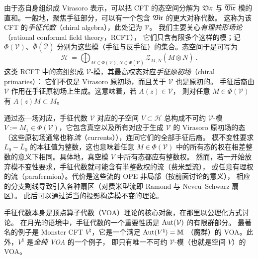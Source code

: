 由于态自身组织成 Virasoro 表示，可以把 CFT 的态空间分解为 $\mathfrak{Vir}$ 与 $\overline{\mathfrak{Vir}}$
模的直和。一般地，聚焦手征部分，可以有一个包含 $\mathfrak{Vir}$ 的更大对称代数。
这称为该 CFT 的\emph{手征代数}（chiral algebra），此处记为 $\mathcal{V}$。
我们主要关心\emph{有理共形场论}（rational conformal field theory，RCFT），
它们只含有限多个这样的模；记 $\Phi(\mathcal{V})$、$\overline{\Phi}(\overline{\mathcal{V}})$
分别为这些模（手征与反手征）的集合。态空间于是可写为
\begin{equation}
\label{eq:split_modules_hilbert_space}
\mathcal{H}~=\bigoplus_{M\in\Phi(\mathcal{V}),\overline{N}\in\overline{\Phi}(\overline{\mathcal{V}})}\mathcal{Z}_{M,\overline{N}}\left(M\otimes\overline{N}\right)~.
\end{equation}
这类 RCFT 中的态组织成 $\mathcal{V}$-模，其最高权态对应\emph{手征原初场}（chiral primaries）：
它们不仅是 Virasoro 原初场，而且关于 $\mathcal{V}$ 也是原初的。
手征后裔由 $\mathcal{V}$ 作用在手征原初场上生成。这意味着，若 $A(z)\in\mathcal{V}$，
则对任意 $M\in\Phi(\mathcal{V})$ 有 $A(z)M\subset M$。


通过态—场对应，手征代数 $\mathcal{V}$ 对应的子空间 $V\subset\mathcal{H}$ 总构成不可约
$\mathcal{V}$-模 $V:=M_1\in\Phi(\mathcal{V})$，它包含真空以及所有对应于生成 $\mathcal{V}$
的 Virasoro 原初场的态（这些原初场通常也称\emph{流}（currents）），连同它们的全部手征后裔。
模不变性要求 $L_0-\overline{L}_0$ 的本征值为整数，这也意味着任意 $M\in\Phi(\mathcal{V})$
中的所有态的权在相差整数的意义下相同。具体地，真空模 $V$ 中所有态都应有整数权。
然而，若一开始放弃模不变性要求，手征代数就可能含有半整数权的流（费米型流），
或任意有理权的流（parafermion）。代价是这些流的 OPE 非局部（按前面讨论的意义），
相应的分支割线导致引入各种扇区（对费米型流即 Ramond 与 Neveu–Schwarz 扇区）。
此后可以通过适当的投影构造模不变的理论。


手征代数本身是顶点算子代数（VOA）理论的核心对象，在那里以公理化方式讨论。
在月光的语境中，手征代数的一个重要性质是 $\operatorname{\text{Aut}}(\mathcal{V})$ 的有限群部分。
最著名的例子是 Monster CFT $V^\natural$，它是一个满足 $\operatorname{\text{Aut}}(V^\natural)=\mathbb{M}$
（魔群）的 VOA。此外，$V^\natural$ 是\emph{全纯 VOA} 的一个例子，
即只有唯一不可约 $\mathcal{V}$-模（也就是空间 $V$）的 VOA。

